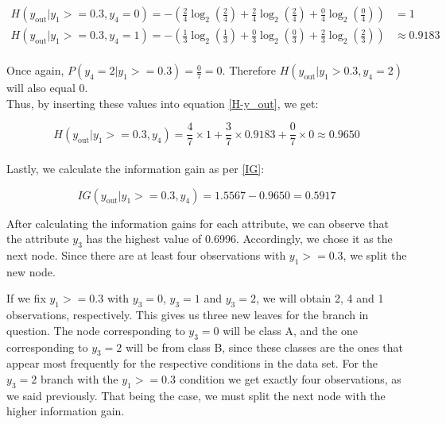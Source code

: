 \documentclass[12pt]{article}
\begin{document}
\begin{enumerate}[leftmargin=\labelsep]
\begin{equation*}
    \begin{aligned}
        H(y_{\text{out}}|y_1 >= 0.3, y_4 = 0) = - \left( \frac{2}{4} \log_2 \left( \frac{2}{4} \right) + \frac{2}{4} \log_2 \left( \frac{2}{4} \right) + \frac{0}{4} \log_2 \left( \frac{0}{4} \right) \right) &= 1 
        \\
        H(y_{\text{out}}|y_1 >= 0.3, y_4 = 1) = - \left( \frac{1}{3} \log_2 \left( \frac{1}{3} \right) + \frac{0}{3} \log_2 \left( \frac{0}{3} \right) + \frac{2}{3} \log_2 \left( \frac{2}{3} \right) \right) &\approx 0.9183
        \\
    \end{aligned}
\end{equation*}

\newpage

Once again,  $P(y_4 = 2 | y_1 >= 0.3) = \frac{0}{7} = 0$. Therefore $H(y_{\text{out}} | y_1 > 0.3, y_4 = 2)$ will also equal 0.\\

Thus, by inserting these values into equation \eqref{H-y_out}, we get:

\begin{equation*}
    H(y_{\text{out}}|y_1 >= 0.3, y_4) = \frac{4}{7} \times 1 + \frac{3}{7} \times 0.9183 + \frac{0}{7} \times 0 \approx 0.9650
\end{equation*}
\\
Lastly, we calculate the information gain as per \eqref{IG}:

\begin{equation*}
    IG(y_{\text{out}} | y_1 >= 0.3, y_4) = 1.5567 - 0.9650 = 0.5917
\end{equation*}

\vspace{0.5cm}

\hspace*{2em}After calculating the information gains for each attribute, we can observe that the attribute $y_3$ has the highest value of 0.6996. 
Accordingly, we chose it as the next node. Since there are at least four observations with $y_1 >= 0.3$, we split the new node. 

\hspace*{2em}If we fix $y_1 >= 0.3$ with $y_3 = 0$, $y_3 = 1$ and $y_3 = 2$, we will obtain 2, 4 and 1 observations, respectively. This gives us three new leaves for the branch in question. The node corresponding to $y_3 = 0$ will be class A, and the one corresponding to $y_3 = 2$ will be from class B, since these classes are the ones that appear most frequently for the respective conditions in the data set.
For the $y_3 = 2$ branch with the $y_1 >= 0.3$  condition we get exactly four observations, as we said previously. That being the case, we must split the next node with the higher information gain. 


\end{enumerate}
\end{document}

